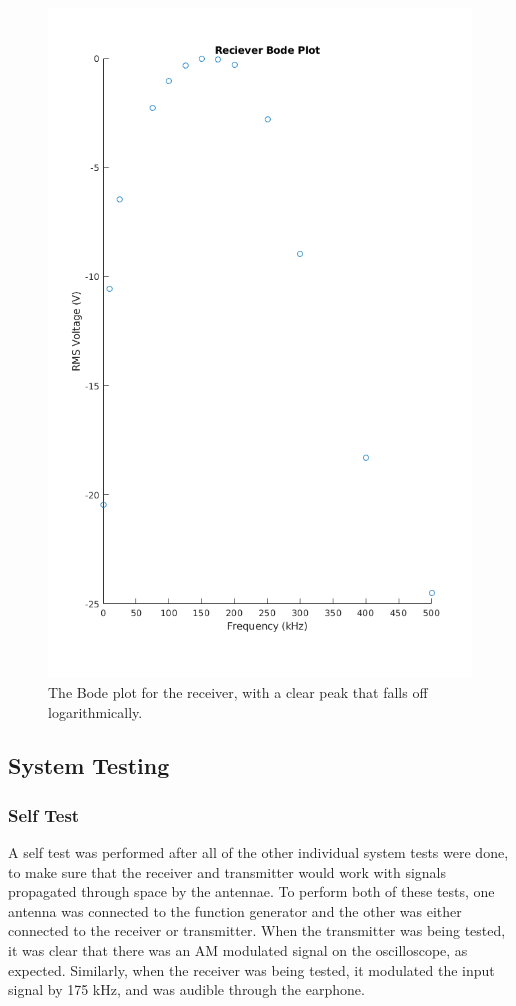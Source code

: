 \documentclass[10pt]{article}
\begin{document}
 \begin{center}
	\begin{figure}[H]
		\centering
		\includegraphics[scale = 0.35]{images/receiverbode.png}
		\caption{The Bode plot for the receiver, with a clear peak that falls off logarithmically.}
		\label{fig:recieverbode}
	\end{figure}
\end{center}


\subsection{System Testing}

\subsubsection{Self Test}
A self test was performed after all of the other individual system tests were done, to make sure that the receiver and transmitter would work with signals propagated through space by the antennae. To perform both of these tests, one antenna was connected to the function generator and the other was either connected to the receiver or transmitter. When the transmitter was being tested, it was clear that there was an AM modulated signal on the oscilloscope, as expected. Similarly, when the receiver was being tested, it modulated the input signal by 175 kHz, and was audible through the earphone. 
\end{document}
